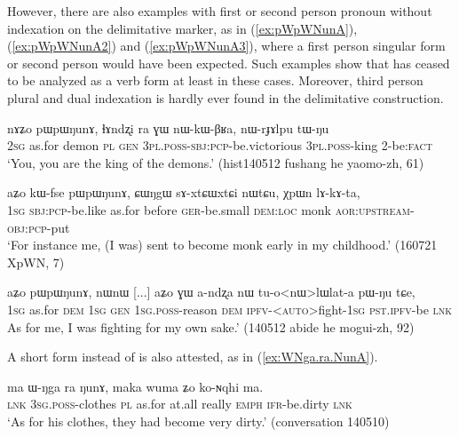 However, there are also examples with first or second person pronoun without indexation on the delimitative marker, as in (\ref{ex:pWpWNunA}), (\ref{ex:pWpWNunA2}) and (\ref{ex:pWpWNunA3}), where a first person singular form  or second person  would have been expected. Such examples show that  has ceased to be analyzed as a verb form at least in these cases. Moreover, third person plural and dual indexation is hardly ever found in the delimitative construction.

\begin{exe}
\ex \label{ex:pWpWNunA}
\gll nɤʑo pɯpɯŋunɤ, ɬɤndʐi ra ɣɯ nɯ-kɯ-βʁa, nɯ-rɟɤlpu tɯ-ŋu \\
\textsc{2sg} as.for demon \textsc{pl} \textsc{gen} \textsc{3pl}.\textsc{poss}-\textsc{sbj}:\textsc{pcp}-be.victorious \textsc{3pl}.\textsc{poss}-king 2-be:\textsc{fact} \\
\glt `You, you are the king of the demons.' (hist140512 fushang he yaomo-zh, 61)
\end{exe}

\begin{exe}
\ex \label{ex:pWpWNunA2}
\gll  aʑo kɯ-fse pɯpɯŋunɤ, ɕɯŋgɯ sɤ-xtɕɯ\redp{}xtɕi nɯtɕu, χpɯn lɤ-kɤ-ta, \\
\textsc{1sg} \textsc{sbj}:\textsc{pcp}-be.like as.for  before \textsc{ger}-be.small \textsc{dem}:\textsc{loc} monk \textsc{aor}:\textsc{upstream}-\textsc{obj}:\textsc{pcp}-put \\
\glt `For instance me, (I was) sent to become monk early in my childhood.' (160721 XpWN, 7)
  \end{exe}

\begin{exe}
\ex \label{ex:pWpWNunA3}
\gll aʑo pɯpɯŋunɤ, nɯnɯ [...] aʑo ɣɯ a-ndʐa nɯ tu-o<nɯ>lɯlat-a pɯ-ŋu tɕe, \\
\textsc{1sg} as.for \textsc{dem} { } \textsc{1sg} \textsc{gen} \textsc{1sg}.\textsc{poss}-reason \textsc{dem} \textsc{ipfv}-<\textsc{auto}>fight-\textsc{1sg} \textsc{pst}.\textsc{ipfv}-be \textsc{lnk} \\
\glt  As for me, I was fighting for my own sake.' (140512 abide he mogui-zh, 92)
 \end{exe}
 
A short form  instead of  is also attested, as in (\ref{ex:WNga.ra.NunA}).

\begin{exe}
\ex \label{ex:WNga.ra.NunA}
\gll ma ɯ-ŋga ra ŋunɤ, maka wuma ʑo ko-ɴqhi ma. \\
\textsc{lnk} \textsc{3sg}.\textsc{poss}-clothes \textsc{pl} as.for at.all really \textsc{emph} \textsc{ifr}-be.dirty \textsc{lnk} \\
\glt `As for his clothes, they had become very dirty.' (conversation 140510)
\end{exe}
 
